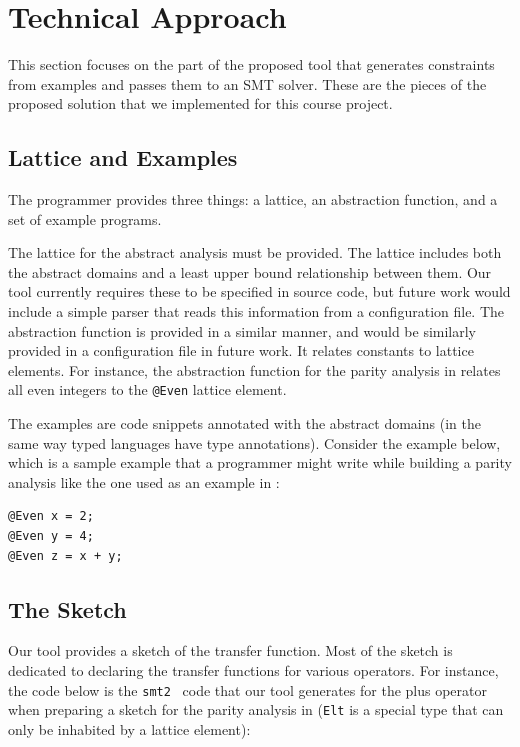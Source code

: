\documentclass[10pt,conference]{IEEEtran}
\begin{document}
\section{Technical Approach}
\label{sec-tech}

This section focuses on the part of the proposed tool that generates
constraints from examples and passes them to an SMT solver. These are
the pieces of the proposed solution that we implemented for this course
project.

\subsection{Lattice and Examples}
\label{sec-input}

The programmer provides three things: a lattice,
an abstraction function, and a set of example programs.

The lattice for the abstract analysis must be provided.
The lattice includes both the abstract domains and a least
upper bound relationship between them. Our tool currently
requires these to be specified in source code, but future
work would include a simple parser that reads this information
from a configuration file. The abstraction function is provided
in a similar manner, and would be similarly provided in a configuration
file in future work. It relates constants to lattice elements.
For instance, the abstraction function for the parity analysis
in  relates all even integers to the \lstinline{@Even}
lattice element.

The examples are code snippets annotated with the
abstract domains (in the same way typed languages have type annotations).
Consider the example below, which is a sample example that a
programmer might write while building a parity analysis like the one
used as an example in :

\begin{lstlisting}
@Even x = 2;
@Even y = 4;
@Even z = x + y;
\end{lstlisting}

\subsection{The Sketch}
\label{sec-sketch}

Our tool provides a sketch of the transfer function. Most of the
sketch is dedicated to declaring the transfer functions for various
operators. For instance, the code below is the \lstinline{smt2}~\cite{smt2}
code that our tool generates for the plus operator when preparing
a sketch for the parity analysis in  (\lstinline{Elt} is
a special type that can only be inhabited by a lattice element):
\end{document}
